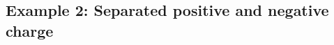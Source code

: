 \documentclass[journal=jacsat,manuscript=article]{achemso}
\renewcommand{\v}[1]{\textbf{\textit{#1}}}
\begin{document}




\subsection{Example 2: Separated positive and negative charge}
\label{sec:example2}

\end{document}

